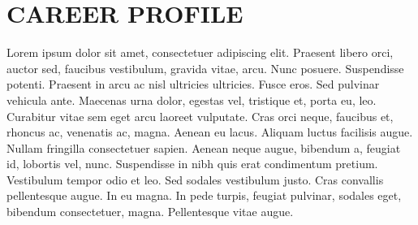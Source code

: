 \documentclass[9pt]{orbit-cv}
\begin{document}








\makeprofile


\section{\faUser{} CAREER PROFILE}
Lorem ipsum dolor sit amet, consectetuer adipiscing elit. Praesent libero orci, auctor sed, faucibus vestibulum, gravida vitae, arcu. Nunc posuere. Suspendisse potenti. Praesent in arcu ac nisl ultricies ultricies. Fusce eros. Sed pulvinar vehicula ante. Maecenas urna dolor, egestas vel, tristique et, porta eu, leo. Curabitur vitae sem eget arcu laoreet vulputate. Cras orci neque, faucibus et, rhoncus ac, venenatis ac, magna. Aenean eu lacus. Aliquam luctus facilisis augue. Nullam fringilla consectetuer sapien. Aenean neque augue, bibendum a, feugiat id, lobortis vel, nunc. Suspendisse in nibh quis erat condimentum pretium. Vestibulum tempor odio et leo. Sed sodales vestibulum justo. Cras convallis pellentesque augue. In eu magna. In pede turpis, feugiat pulvinar, sodales eget, bibendum consectetuer, magna. Pellentesque vitae augue.
\end{document}
